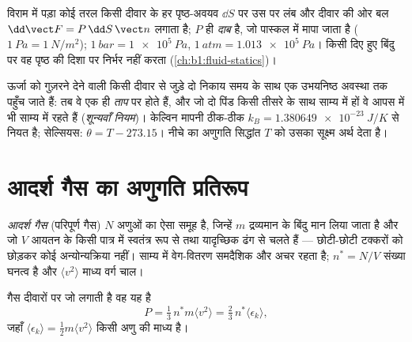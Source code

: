 \begin{definition}[दाब]\label{def:b1:kinetic-theory:pressure}
विराम में पड़ा कोई तरल किसी दीवार के हर पृष्ठ-अवयव $\dd S$ पर उस पर लंब
और दीवार की ओर बल $\dd\vect F = P\,\dd S\,\vect n$ लगाता है; $P$ ही
\emph{दाब} है, जो पास्कल में मापा जाता है ($\qty{1}{Pa} = \qty{1}{N/m^2}$); $\qty{1}{bar}
= \qty{1e5}{Pa}$, $\qty{1}{atm} = \qty{1.013e5}{Pa}$। किसी दिए हुए बिंदु पर
वह पृष्ठ की दिशा पर निर्भर नहीं करता (\cref{ch:b1:fluid-statics})।
\end{definition}

\begin{definition}[ताप]\label{def:b1:kinetic-theory:temperature}
ऊर्जा को गुज़रने देने वाली किसी दीवार से जुड़े दो निकाय समय के साथ एक
उभयनिष्ठ अवस्था तक पहुँच जाते हैं: तब वे एक ही \emph{ताप} पर होते हैं, और
जो दो पिंड किसी तीसरे के साथ साम्य में हों वे आपस में भी साम्य में रहते
हैं (\emph{शून्यवाँ नियम})। केल्विन मापनी ठीक-ठीक
$k_B = \qty{1.380649e-23}{J/K}$ से नियत है; सेल्सियस: $\theta = T - 273.15$। नीचे
का अणुगति सिद्धांत $T$ को उसका सूक्ष्म अर्थ देता है।
\end{definition}

\section{आदर्श गैस का अणुगति प्रतिरूप}

\begin{definition}[आदर्श गैस, सूक्ष्म प्रतिरूप]\label{def:b1:kinetic-theory:model}
\emph{आदर्श गैस} (परिपूर्ण गैस) $N$ अणुओं का ऐसा समूह है, जिन्हें $m$
द्रव्यमान के बिंदु मान लिया जाता है और जो $V$ आयतन के किसी पात्र में
स्वतंत्र रूप से तथा यादृच्छिक ढंग से चलते हैं --- छोटी-छोटी टक्करों को
छोड़कर कोई अन्योन्यक्रिया नहीं। साम्य में वेग-वितरण समदैशिक और अचर रहता है;
$n^* = N/V$ संख्या घनत्व है और $\langle v^2\rangle$ माध्य वर्ग चाल।
\end{definition}

\begin{theorem}[गतिज दाब]\label{thm:b1:kinetic-theory:pressure}
गैस दीवारों पर जो  लगाती है वह यह है
\[
P = \tfrac13\,n^*m\langle v^2\rangle = \tfrac23\,n^*\langle\epsilon_k\rangle ,
\]
जहाँ $\langle\epsilon_k\rangle = \tfrac12 m\langle v^2\rangle$ किसी अणु की
माध्य  है।
\end{theorem}

